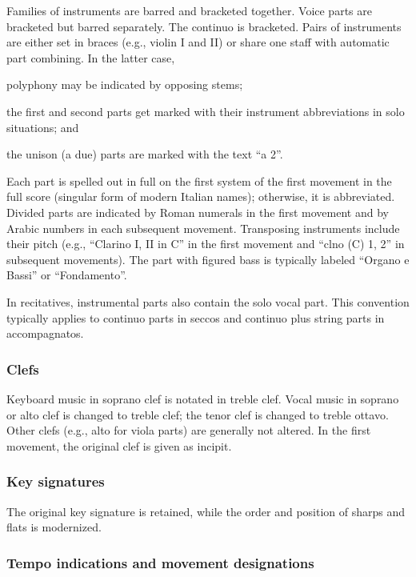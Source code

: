 \documentclass{ees}
\begin{document}
Families of instruments are barred and bracketed together. Voice parts are bracketed but barred separately. The continuo is bracketed. Pairs of instruments are either set in braces (e.g., violin I and II) or share one staff with automatic part combining. In the latter case,
\begin{bulletlist}
  \item polyphony may be indicated by opposing stems;
  \item the first and second parts get marked with their instrument abbreviations in solo situations; and
  \item the unison (a due) parts are marked with the text “a 2”.
\end{bulletlist}

Each part is spelled out in full on the first system of the first movement in the full score (singular form of modern Italian names); otherwise, it is abbreviated. Divided parts are indicated by Roman numerals in the first movement and by Arabic numbers in each subsequent movement. Transposing instruments include their pitch (e.g., “Clarino I, II in C” in the first movement and “clno (C) 1, 2” in subsequent movements). The part with figured bass is typically labeled “Organo e Bassi” or “Fondamento”.

In recitatives, instrumental parts also contain the solo vocal part. This convention typically applies to continuo parts in seccos and continuo plus string parts in accompagnatos.


\subsubsection{Clefs}

Keyboard music in soprano clef is notated in treble clef. Vocal music in soprano or alto clef is changed to treble clef; the tenor clef is changed to treble ottavo. Other clefs (e.g., alto for viola parts) are generally not altered. In the first movement, the original clef is given as incipit.


\subsubsection{Key signatures}

The original key signature is retained, while the order and position of sharps and flats is modernized.


\subsubsection{Tempo indications and movement designations}
\end{document}

